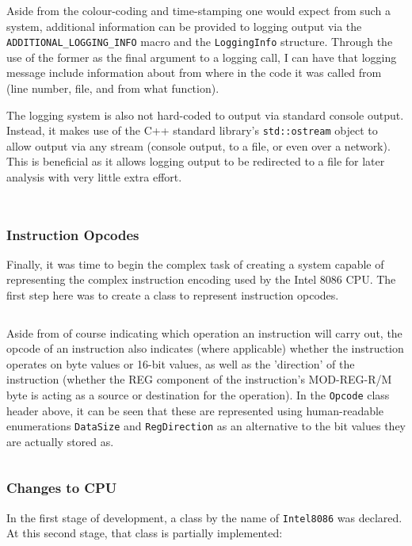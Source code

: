         Aside from the colour-coding and time-stamping one would expect from such a system, additional information can be provided to logging output via the \texttt{ADDITIONAL\_LOGGING\_INFO} macro and the \texttt{LoggingInfo} structure. Through the use of the former as the final argument to a logging call, I can have that logging message include information about from where in the code it was called from (line number, file, and from what function).

        The logging system is also not hard-coded to output via standard console output. Instead, it makes use of the C++ standard library's \texttt{std::ostream} object to allow output via any stream (console output, to a file, or even over a network). This is beneficial as it allows logging output to be redirected to a file for later analysis with very little extra effort.

        \inputminted{c++}{code/second/logging.hpp}

        \inputminted{c++}{code/second/logging.cpp}

    \subsubsection{Instruction Opcodes} \label{sec:second-opcodes}
        Finally, it was time to begin the complex task of creating a system capable of representing the complex instruction encoding used by the Intel 8086 CPU. The first step here was to create a class to represent instruction opcodes.

        \inputminted{c++}{code/second/opcode.hpp}

        Aside from of course indicating which operation an instruction will carry out, the opcode of an instruction also indicates (where applicable) whether the instruction operates on byte values or 16-bit values, as well as the 'direction' of the instruction (whether the REG component of the instruction's MOD-REG-R/M byte is acting as a source or destination for the operation). In the \texttt{Opcode} class header above, it can be seen that these are represented using human-readable enumerations \texttt{DataSize} and \texttt{RegDirection} as an alternative to the bit values they are actually stored as.

        \inputminted{c++}{code/second/opcode.cpp}

    \subsubsection{Changes to CPU}
        In the first stage of development, a class by the name of \texttt{Intel8086} was declared. At this second stage, that class is partially implemented:

